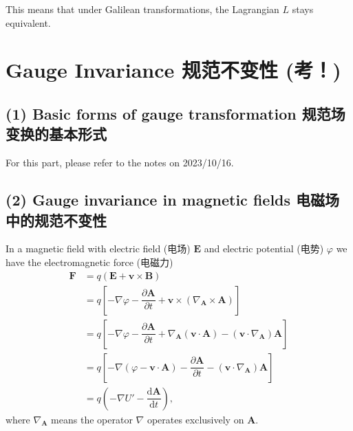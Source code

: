 This means that under Galilean transformations, the Lagrangian \(L\)
stays equivalent.

\section{Gauge Invariance 规范不变性
(考！)}\label{gauge-invariance-ux89c4ux8303ux4e0dux53d8ux6027-ux8003}

\subsection*{(1) Basic forms of gauge transformation
规范场变换的基本形式}\label{basic-forms-of-gauge-transformation-ux89c4ux8303ux573aux53d8ux6362ux7684ux57faux672cux5f62ux5f0f}

For this part, please refer to the notes on 2023/10/16.

\subsection*{(2) Gauge invariance in magnetic fields
电磁场中的规范不变性}\label{gauge-invariance-in-magnetic-fields-ux7535ux78c1ux573aux4e2dux7684ux89c4ux8303ux4e0dux53d8ux6027}

In a magnetic field with electric field (电场) \(\boldsymbol{E}\) and
electric potential (电势) \(\varphi\) we have the electromagnetic force
(电磁力) \begin{align*}
    \boldsymbol{F} & = q \left( \boldsymbol{E} + \boldsymbol{v} \times \boldsymbol{B} \right) \\
    & = q \left[ - \nabla \varphi - \dfrac{\partial \boldsymbol A }{\partial t} + \boldsymbol{v} \times \left( \nabla_{\boldsymbol{A}} \times \boldsymbol{A} \right) \right] \\
    & = q \left[ - \nabla \varphi - \dfrac{\partial \boldsymbol A }{\partial t} + \nabla_{\boldsymbol{A}} \left( \boldsymbol{v} \cdot \boldsymbol{A} \right) - \left( \boldsymbol{v} \cdot \nabla_{\boldsymbol{A}} \right) \boldsymbol{A} \right] \\
    & = q \left[ - \nabla \left( \varphi - \boldsymbol{v} \cdot \boldsymbol{A} \right) - \dfrac{\partial \boldsymbol A }{\partial t} - \left( \boldsymbol{v} \cdot \nabla_{\boldsymbol{A}} \right) \boldsymbol{A} \right] \\
    & = q \left( - \nabla U' - \dfrac{\mathrm{d} \boldsymbol{A}}{\mathrm{d}t} \right),
\end{align*} where \(\nabla_{\boldsymbol{A}}\) means the operator
\(\nabla\) operates exclusively on \(\boldsymbol{A}\).

